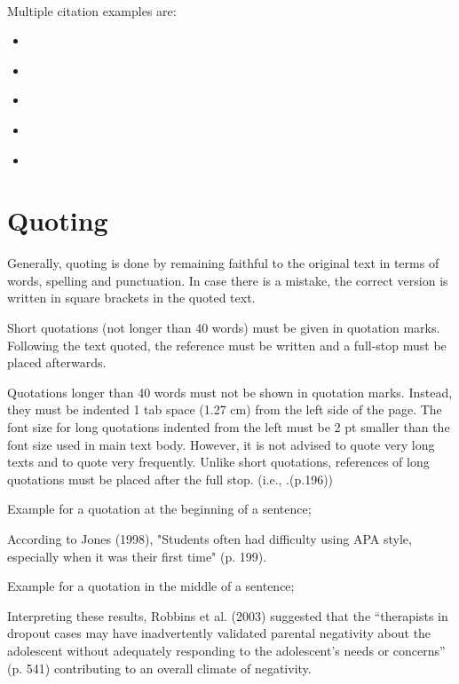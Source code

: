 \vfill\phantom{.}\\

Multiple citation examples are:

\begin{itemize}
    \item \cite{Burke74,17590413,Wegener2000629}
    \item \citep{Burke74,17590413,Wegener2000629}
    \item \citet{Burke74,17590413,Wegener2000629}
    \item \citep*{Burke74,17590413,Wegener2000629}
    \item \citet*{Burke74,17590413,Wegener2000629}
  \end{itemize}

\section{Quoting}

Generally, quoting is done by remaining faithful to the original text in terms of words, spelling and punctuation. In case there is a mistake, the correct version is written in square brackets in the quoted text.

Short quotations (not longer than 40 words) must be given in quotation marks. Following the text quoted, the reference must be written and a full-stop must be placed afterwards.  

Quotations longer than 40 words must not be shown in quotation  marks. Instead, they must be indented 1 tab space (1.27 cm) from the left side of the page. The font size for long quotations indented from the left must be 2 pt smaller than the font size used in main text body. However, it is not advised to quote very long texts and to quote very frequently. Unlike short quotations, references of long quotations must be placed after the full stop. (i.e., .(p.196))

Example for a quotation at the beginning of a sentence;

According to Jones (1998), "Students often had difficulty using APA style,  especially when it was their first time" (p. 199).

Example for a quotation in the middle of a sentence;

Interpreting these results, Robbins et al. (2003) suggested that the “therapists in dropout cases may have inadvertently validated parental negativity about the adolescent without adequately responding to the adolescent’s needs or concerns” (p. 541) contributing to an overall climate of negativity.

